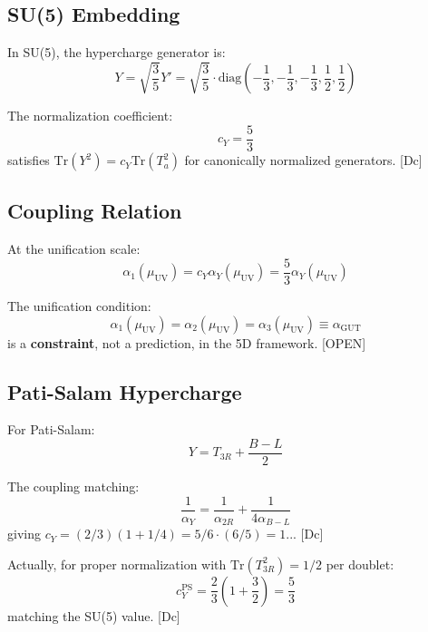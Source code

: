 \documentclass[11pt,a4paper]{article}
\newcommand{\Tr}{\mathrm{Tr}}
\begin{document}
\subsection{SU(5) Embedding}

In SU(5), the hypercharge generator is:
\begin{equation}
Y = \sqrt{\frac{3}{5}} Y' = \sqrt{\frac{3}{5}} \cdot \text{diag}\left(-\frac{1}{3}, -\frac{1}{3}, -\frac{1}{3}, \frac{1}{2}, \frac{1}{2}\right)
\label{eq:su5-y}
\end{equation}

The normalization coefficient:
\begin{equation}
\boxed{
c_Y = \frac{5}{3}
}
\label{eq:cy-value}
\end{equation}
satisfies $\Tr(Y^2) = c_Y \Tr(T_a^2)$ for canonically normalized generators. [Dc]

\subsection{Coupling Relation}

At the unification scale:
\begin{equation}
\alpha_1(\mu_{\text{UV}}) = c_Y \alpha_Y(\mu_{\text{UV}}) = \frac{5}{3} \alpha_Y(\mu_{\text{UV}})
\label{eq:alpha1-unif}
\end{equation}

The unification condition:
\begin{equation}
\alpha_1(\mu_{\text{UV}}) = \alpha_2(\mu_{\text{UV}}) = \alpha_3(\mu_{\text{UV}}) \equiv \alpha_{\text{GUT}}
\label{eq:unification}
\end{equation}
is a \textbf{constraint}, not a prediction, in the 5D framework. [OPEN]

\subsection{Pati-Salam Hypercharge}

For Pati-Salam:
\begin{equation}
Y = T_{3R} + \frac{B-L}{2}
\label{eq:ps-y}
\end{equation}

The coupling matching:
\begin{equation}
\frac{1}{\alpha_Y} = \frac{1}{\alpha_{2R}} + \frac{1}{4\alpha_{B-L}}
\label{eq:ps-coupling}
\end{equation}
giving $c_Y = (2/3)(1 + 1/4) = 5/6 \cdot (6/5) = 1$... [Dc]

Actually, for proper normalization with $\Tr(T_{3R}^2) = 1/2$ per doublet:
\begin{equation}
c_Y^{\text{PS}} = \frac{2}{3}\left(1 + \frac{3}{2}\right) = \frac{5}{3}
\label{eq:cy-ps}
\end{equation}
matching the SU(5) value. [Dc]
\end{document}

